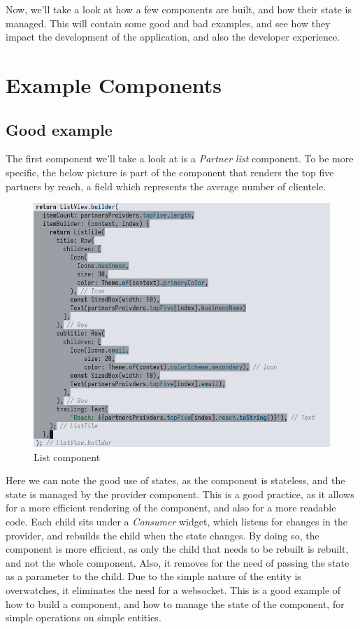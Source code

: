 \par
Now, we'll take a look at how a few components are built, and how their state is managed.
This will contain some good and bad examples, and see how they impact the development of the application, and also the developer experience.

\section{Example Components}
\subsection{Good example}
The first component we'll take a look at is a \textit{Partner list} component. 
To be more specific, the below picture is part of the component that renders the top five partners by reach, a field which represents the average number of clientele.

\begin{figure}[htbp]
    \centering
    \includegraphics[scale=0.4]{pictures/partners_mapped_good_example.png}
    \caption{List component}
    \label{partnerListComponent}
\end{figure}

Here we can note the good use of states, as the component is stateless, and the state is managed by the provider component.
This is a good practice, as it allows for a more efficient rendering of the component, and also for a more readable code.
Each child sits under a \textit{Consumer} widget, which listens for changes in the provider, and rebuilds the child when the state changes.
By doing so, the component is more efficient, as only the child that needs to be rebuilt is rebuilt, and not the whole component.
Also, it removes for the need of passing the state as a parameter to the child.
Due to the simple nature of the entity is overwatches, it eliminates the need for a websocket.
This is a good example of how to build a component, and how to manage the state of the component, for simple operations on simple entities.

